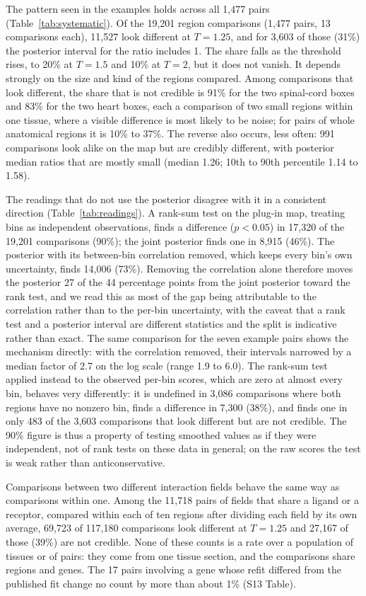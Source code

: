 \documentclass[10pt,letterpaper]{article}
\begin{document}
The pattern seen in the examples holds across all 1,477 pairs (Table~\ref{tab:systematic}). Of the 19,201 region comparisons (1,477 pairs, 13 comparisons each), 11,527 look different at $T = 1.25$, and for 3,603 of those (31\%) the posterior interval for the ratio includes 1. The share falls as the threshold rises, to 20\% at $T = 1.5$ and 10\% at $T = 2$, but it does not vanish. It depends strongly on the size and kind of the regions compared. Among comparisons that look different, the share that is not credible is 91\% for the two spinal-cord boxes and 83\% for the two heart boxes, each a comparison of two small regions within one tissue, where a visible difference is most likely to be noise; for pairs of whole anatomical regions it is 10\% to 37\%. The reverse also occurs, less often: 991 comparisons look alike on the map but are credibly different, with posterior median ratios that are mostly small (median 1.26; 10th to 90th percentile 1.14 to 1.58).

The readings that do not use the posterior disagree with it in a consistent direction (Table~\ref{tab:readings}). A rank-sum test on the plug-in map, treating bins as independent observations, finds a difference ($p < 0.05$) in 17,320 of the 19,201 comparisons (90\%); the joint posterior finds one in 8,915 (46\%). The posterior with its between-bin correlation removed, which keeps every bin's own uncertainty, finds 14,006 (73\%). Removing the correlation alone therefore moves the posterior 27 of the 44 percentage points from the joint posterior toward the rank test, and we read this as most of the gap being attributable to the correlation rather than to the per-bin uncertainty, with the caveat that a rank test and a posterior interval are different statistics and the split is indicative rather than exact. The same comparison for the seven example pairs shows the mechanism directly: with the correlation removed, their intervals narrowed by a median factor of 2.7 on the log scale (range 1.9 to 6.0). The rank-sum test applied instead to the observed per-bin scores, which are zero at almost every bin, behaves very differently: it is undefined in 3,086 comparisons where both regions have no nonzero bin, finds a difference in 7,300 (38\%), and finds one in only 483 of the 3,603 comparisons that look different but are not credible. The 90\% figure is thus a property of testing smoothed values as if they were independent, not of rank tests on these data in general; on the raw scores the test is weak rather than anticonservative.

Comparisons between two different interaction fields behave the same way as comparisons within one. Among the 11,718 pairs of fields that share a ligand or a receptor, compared within each of ten regions after dividing each field by its own average, 69,723 of 117,180 comparisons look different at $T = 1.25$ and 27,167 of those (39\%) are not credible. None of these counts is a rate over a population of tissues or of pairs: they come from one tissue section, and the comparisons share regions and genes. The 17 pairs involving a gene whose refit differed from the published fit change no count by more than about 1\% (S13 Table).
\end{document}
